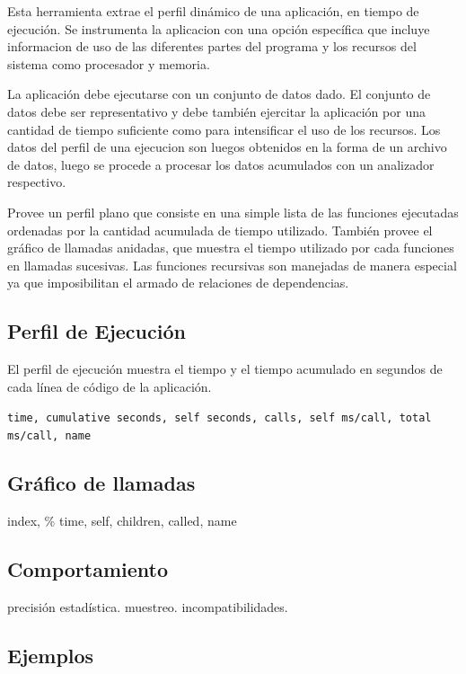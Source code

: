 \documentclass[a4paper]{report}
\begin{document}
Esta herramienta extrae el perfil din\'amico de una aplicaci\'on, en tiempo
de ejecuci\'on. Se instrumenta la aplicacion con una opci\'on espec\'ifica que
incluye informacion de uso de las diferentes partes del programa y los
recursos del sistema como procesador y memoria.

\bigskip

La aplicaci\'on debe ejecutarse con un conjunto de datos dado. El conjunto de
datos debe ser representativo y debe tambi\'en ejercitar la aplicaci\'on por
una cantidad de tiempo suficiente como para intensificar el uso de los
recursos. Los datos del perfil de una ejecucion son luegos obtenidos en la
forma de un archivo de datos, luego se procede a procesar los datos acumulados
con un analizador respectivo.

\bigskip

Provee un perfil plano que consiste en una simple lista de las funciones
ejecutadas ordenadas por la cantidad acumulada de tiempo utilizado.
Tambi\'en provee el gr\'afico de llamadas anidadas, que muestra el tiempo
utilizado por cada funciones en llamadas sucesivas. Las funciones recursivas
son manejadas de manera especial ya que imposibilitan el armado de relaciones
de dependencias.

\subsection{Perfil de Ejecuci\'on}

El perfil de ejecuci\'on muestra el tiempo y el tiempo acumulado en segundos
de cada l\'inea de c\'odigo de la aplicaci\'on.

{\tt time, cumulative seconds, self seconds, calls, self ms/call,
  total ms/call, name}

\subsection{Gr\'afico de llamadas}

index, \% time, self, children, called, name

\subsection{Comportamiento}

precisi\'on estad\'istica. muestreo. incompatibilidades.

\subsection{Ejemplos}
\end{document}
